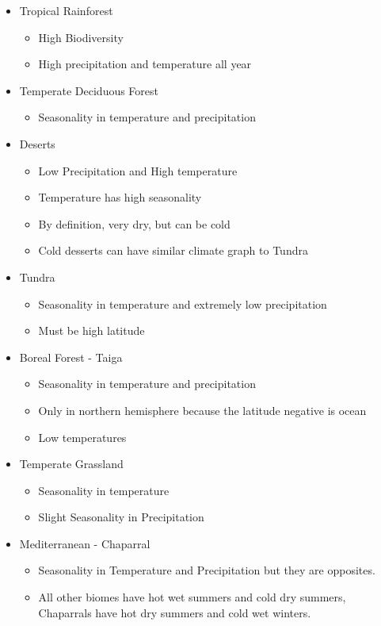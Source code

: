\documentclass[12pt]{article}
\begin{document}
\begin{itemize}
    \item Tropical Rainforest
          \begin{itemize}
              \item High Biodiversity
              \item High precipitation and temperature all year
          \end{itemize}
    \item Temperate Deciduous Forest
          \begin{itemize}
              \item Seasonality in temperature and precipitation
          \end{itemize}
    \item Deserts
          \begin{itemize}
              \item Low Precipitation and High temperature
              \item Temperature has high seasonality
              \item By definition, very dry, but can be cold
              \item Cold desserts can have similar climate graph to Tundra
          \end{itemize}
    \item Tundra
          \begin{itemize}
              \item Seasonality in temperature and extremely low precipitation
              \item Must be high latitude
          \end{itemize}
    \item Boreal Forest - Taiga
          \begin{itemize}
              \item Seasonality in temperature and precipitation
              \item Only in northern hemisphere because the latitude negative is ocean
              \item Low temperatures
          \end{itemize}
    \item Temperate Grassland
          \begin{itemize}
              \item Seasonality in temperature
              \item Slight Seasonality in Precipitation
          \end{itemize}
    \item Mediterranean - Chaparral
          \begin{itemize}
              \item Seasonality in Temperature and Precipitation but they are opposites.
              \item All other biomes have hot wet summers and cold dry summers, Chaparrals have hot dry summers and cold wet winters.
          \end{itemize}
\end{itemize}
\end{document}
